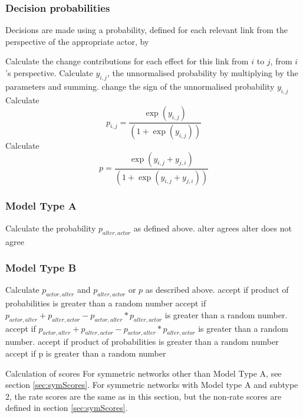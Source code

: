 \documentclass[12pt,a4paper]{article}
\makeatletter
\renewcommand{\=}{\,=\,}
\newcommand{\+}{\,+\,}
\renewcommand{\subsection}{\@startsection{subsection}{2}
                {0pt}{0.7\baselineskip}{0.3\baselineskip}
                {\sffamily} }
\makeatother
\begin{document}
\subsubsection{Decision probabilities}
Decisions are made using a probability, defined for each relevant link from the
perspective of the appropriate actor, by
\begin{algorithmic}
\STATE Calculate the change contributions for each effect for this link from
$i$ to $j$, from $i$'s perspective. 
\STATE Calculate $y_{i,j}$, the unnormalised probability by multiplying by the
parameters and summing.
\STATE change the sign of the unnormalised probability $y_{i,j}$
\ENDIF
{}
\STATE Calculate $$p_{i,j} = \frac{\exp(y_{i,j})} { (1 + \exp(y_{i,j}))}$$
\ELSE
\STATE Calculate $$p = \frac{\exp(y_{i,j} + y_{j,i})}
{(1 + \exp(y_{i,j} + y_{j,i}))}$$
\ENDIF
\end{algorithmic}
\subsubsection{Model Type A}
\label{sec:alterSymA}
\begin{algorithmic}
\STATE Calculate the probability $p_{alter, actor}$ as defined above.
\STATE alter agrees
\ELSE
\STATE alter does not agree
\ENDIF
\end{algorithmic}
\subsubsection{Model Type B}
\label{sec:alterSymB}
\begin{algorithmic}
\STATE Calculate $p_{actor, alter}$ and $p_{alter, actor}$  or $p$ 
as described above.
  \STATE accept if product of probabilities is greater than a random number
  \ELSE 
  \STATE accept if $p_{actor, alter} + p_{alter, actor} - p_{actor, alter} *
p_{alter,actor}$ is greater than a random number.
  \ENDIF
{}
  \STATE accept if $p_{actor, alter} + p_{alter, actor} - p_{actor, alter} *
p_{alter,actor}$ is greater than a random number.
  \ELSE 
  \STATE accept if product of probabilities is greater than a random number
  \ENDIF
{}
\STATE accept if p is greater than a random number 
\ENDIF
\end{algorithmic}
\subsection{Calculation of scores}
\label{sec:scores}
For symmetric networks other than Model Type A, see section
\ref{sec:symScores}. For symmetric networks with Model type A and subtype 2, the
rate scores are the same as in this section, but the non-rate scores are defined
in section \ref{sec:symScores}.
\end{document}
